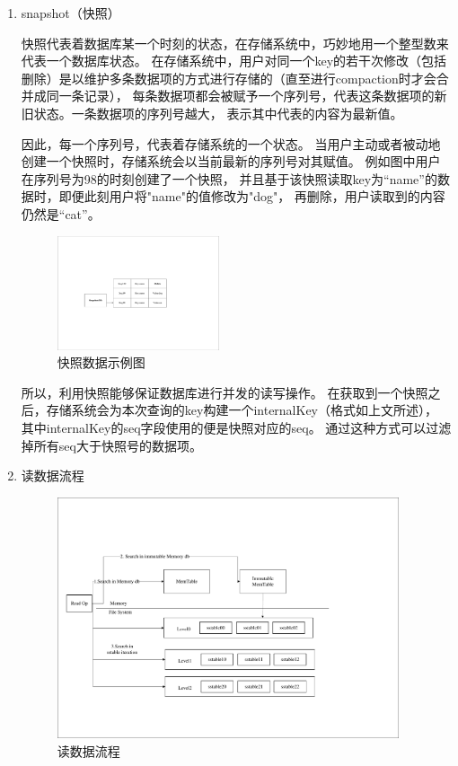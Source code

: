 		\begin{enumerate}
		\item snapshot（快照）
		
		快照代表着数据库某一个时刻的状态，在存储系统中，巧妙地用一个整型数来代表一个数据库状态。
		在存储系统中，用户对同一个key的若干次修改（包括删除）是以维护多条数据项的方式进行存储的（直至进行compaction时才会合并成同一条记录），
		每条数据项都会被赋予一个序列号，代表这条数据项的新旧状态。一条数据项的序列号越大，
		表示其中代表的内容为最新值。

		因此，每一个序列号，代表着存储系统的一个状态。
		当用户主动或者被动地创建一个快照时，存储系统会以当前最新的序列号对其赋值。
		例如图中用户在序列号为98的时刻创建了一个快照，
		并且基于该快照读取key为“name”的数据时，即便此刻用户将"name"的值修改为"dog"，
		再删除，用户读取到的内容仍然是“cat”。

		\begin{figure}[H]
			\centering
			\includegraphics[width=0.45\textwidth]{pdf/snapshot.pdf}
			\caption{快照数据示例图}
			\label{snapshot}
		\end{figure}

		所以，利用快照能够保证数据库进行并发的读写操作。
		在获取到一个快照之后，存储系统会为本次查询的key构建一个internalKey（格式如上文所述），
		其中internalKey的seq字段使用的便是快照对应的seq。
		通过这种方式可以过滤掉所有seq大于快照号的数据项。
		

		\item 读数据流程
		
		\begin{figure}[H]
			\centering
			\includegraphics[width=0.95\textwidth]{pdf/readop.pdf}
			\caption{读数据流程}
			\label{readop}
		\end{figure}


\end{enumerate}
